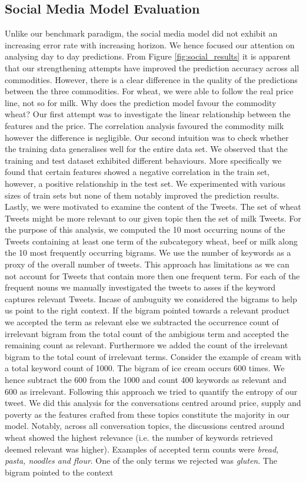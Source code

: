 \subsection{Social Media Model Evaluation}
\label{result_m2}

Unlike our benchmark paradigm, the social media model did not exhibit an increasing error rate with increasing horizon. We hence focused our attention on analysing day to day predictions. From Figure \ref{fig:social_results} it is apparent that our strengthening attempts have improved the prediction accuracy across all commodities. However, there is a clear difference in the quality of the predictions between the three commodities. For wheat, we were able to follow the real price line, not so for milk. Why does the prediction model favour the commodity wheat? Our first attempt was to investigate the linear relationship between the features and the price. The correlation analysis favoured the commodity milk however the difference is negligible. Our second intuition was to check whether the training data generalises well for the entire data set. We observed that the training and test dataset exhibited different behaviours. More specifically we found that certain features showed a negative correlation in the train set, however, a positive relationship in the test set. We experimented with various sizes of train sets but none of them notably improved the prediction results. Lastly, we were motivated to examine the content of the Tweets. The set of wheat Tweets might be more relevant to our given topic then the set of milk Tweets. For the purpose of this analysis, we computed the 10 most occurring nouns of the Tweets containing at least one term of the subcategory wheat, beef or milk along the 10 most frequently occurring bigrams. We use the number of keywords as a proxy of the overall number of tweets. This approach has limitations as we can not account for  Tweets that contain more then one frequent term. For each of the frequent nouns we manually investigated the tweets to asses if the keyword captures relevant Tweets. Incase of ambuguity we considered the bigrams to help us point to the right context. If the bigram pointed towards a relevant product we accepted the term as relevant else we subtracted the occurrence count of irrelevant bigram from the total count of the ambigious term and accepted the remaining count as relevant. Furthermore we added the count of the irrelevant bigram to the total count of irrelevant terms. Consider the example of cream with a total keyword count of 1000. The bigram of ice cream occurs 600 times. We hence subtract the 600 from the 1000 and count 400 keywords as relevant and 600 as irrelevant. Following this approach we tried to quantify the entropy of our tweet. We did this analysis for the conversations centred around price, supply and poverty as the features crafted from these topics constitute the majority in our model. Notably, across all conversation topics, the discussions centred around wheat showed the highest relevance (i.e. the number of keywords retrieved  deemed relevant was higher). Examples of accepted term counts were \emph{bread, pasta, noodles and flour}. One of the only terms we rejected was \emph{gluten}. The bigram pointed to the context 